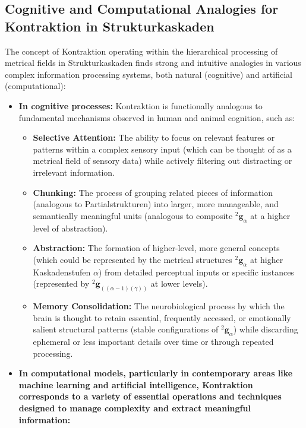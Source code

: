 \documentclass[
    12pt,              %
    a4paper,           %
    headings=normal,   %
    twoside=true,      %
    BCOR=8mm,          %
]{scrbook}
\newcommand{\kompositionsfeld}{{}^2\mathbf{g}}
\newcommand{\partialstruktur}[1]{{}^2\mathbf{g}_{(#1)}}
\newcommand{\kaskadenstufe}{\alpha}
\begin{document}
\subsection{Cognitive and Computational Analogies for Kontraktion in Strukturkaskaden}
\label{sec:ch9_3_3_cognitive_computational_analogies}
The concept of Kontraktion operating within the hierarchical processing of metrical fields in Strukturkaskaden finds strong and intuitive analogies in various complex information processing systems, both natural (cognitive) and artificial (computational):
\begin{itemize}
    \item   \textbf{In cognitive processes:} Kontraktion is functionally analogous to fundamental mechanisms observed in human and animal cognition, such as:
        \begin{itemize}
            \item   \textbf{Selective Attention:} The ability to focus on relevant features or patterns within a complex sensory input (which can be thought of as a metrical field of sensory data) while actively filtering out distracting or irrelevant information.
            \item   \textbf{Chunking:} The process of grouping related pieces of information (analogous to Partialstrukturen) into larger, more manageable, and semantically meaningful units (analogous to composite \(\kompositionsfeld_\alpha\) at a higher level of abstraction).
            \item   \textbf{Abstraction:} The formation of higher-level, more general concepts (which could be represented by the metrical structures \(\kompositionsfeld_\alpha\) at higher Kaskadenstufen \(\kaskadenstufe\)) from detailed perceptual inputs or specific instances (represented by \(\partialstruktur{(\alpha-1)(\gamma)}\) at lower levels).
            \item   \textbf{Memory Consolidation:} The neurobiological process by which the brain is thought to retain essential, frequently accessed, or emotionally salient structural patterns (stable configurations of \(\kompositionsfeld_\alpha\)) while discarding ephemeral or less important details over time or through repeated processing.
        \end{itemize}
    \item   \textbf{In computational models, particularly in contemporary areas like machine learning and artificial intelligence, Kontraktion corresponds to a variety of essential operations and techniques designed to manage complexity and extract meaningful information:}

\end{itemize}
\end{document}

